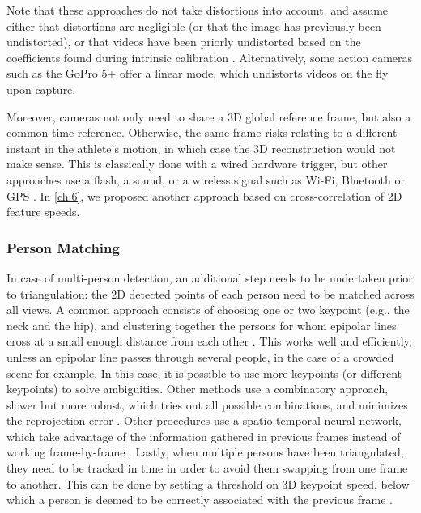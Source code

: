 Note that these approaches do not take distortions into account, and assume either that distortions are negligible (or that the image has previously been undistorted), or that videos have been priorly undistorted based on the coefficients found during intrinsic calibration \cite{Jackson2016}. Alternatively, some action cameras such as the GoPro 5+ offer a linear mode, which undistorts videos on the fly upon capture. 

Moreover, cameras not only need to share a 3D global reference frame, but also a common time reference. Otherwise, the same frame risks relating to a different instant in the athlete's motion, in which case the 3D reconstruction would not make sense. This is classically done with a wired hardware trigger, but other approaches use a flash, a sound, or a wireless signal such as Wi-Fi, Bluetooth or GPS \cite{GoPro2022}. In \autoref{ch:6}, we proposed another approach based on cross-correlation of 2D feature speeds.

\subsubsection{Person Matching}  

In case of multi-person detection, an additional step needs to be undertaken prior to triangulation: the 2D detected points of each person need to be matched across all views. A common approach consists of choosing one or two keypoint (e.g., the neck and the hip), and clustering together the persons for whom epipolar lines cross at a small enough distance from each other \cite{Dong2019,Slembrouck2020,Kadkhodamohammadi2021}. This works well and efficiently, unless an epipolar line passes through several people, in the case of a crowded scene for example. In this case, it is possible to use more keypoints (or different keypoints) to solve ambiguities. Other methods use a combinatory approach, slower but more robust, which tries out all possible combinations, and minimizes the reprojection error \cite{Bridgeman2019,Chen2020c,Pagnon2021}. Other procedures use a spatio-temporal neural network, which take advantage of the information gathered in previous frames instead of working frame-by-frame \cite{Raaj2019}. Lastly, when multiple persons have been triangulated, they need to be tracked in time in order to avoid them swapping from one frame to another. This can be done by setting a threshold on 3D keypoint speed, below which a person is deemed to be correctly associated with the previous frame \cite{Bridgeman2019}.

